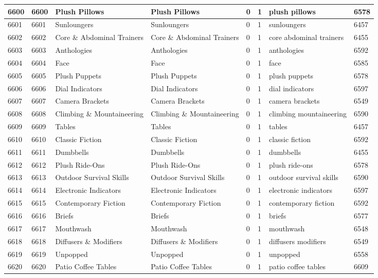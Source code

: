 \begin{longtable}{|l|l|l|l|l|l|l|l|}
6600 & 6600 & Plush Pillows & Plush Pillows & 0 & 1 & plush pillows & 6578 \\ \hline 
6601 & 6601 & Sunloungers & Sunloungers & 0 & 1 & sunloungers & 6457 \\ \hline 
6602 & 6602 & Core \& Abdominal Trainers & Core \& Abdominal Trainers & 0 & 1 & core abdominal trainers & 6455 \\ \hline 
6603 & 6603 & Anthologies & Anthologies & 0 & 1 & anthologies & 6592 \\ \hline 
6604 & 6604 & Face & Face & 0 & 1 & face & 6585 \\ \hline 
6605 & 6605 & Plush Puppets & Plush Puppets & 0 & 1 & plush puppets & 6578 \\ \hline 
6606 & 6606 & Dial Indicators & Dial Indicators & 0 & 1 & dial indicators & 6597 \\ \hline 
6607 & 6607 & Camera Brackets & Camera Brackets & 0 & 1 & camera brackets & 6549 \\ \hline 
6608 & 6608 & Climbing \& Mountaineering & Climbing \& Mountaineering & 0 & 1 & climbing mountaineering & 6590 \\ \hline 
6609 & 6609 & Tables & Tables & 0 & 1 & tables & 6457 \\ \hline 
6610 & 6610 & Classic Fiction & Classic Fiction & 0 & 1 & classic fiction & 6592 \\ \hline 
6611 & 6611 & Dumbbells & Dumbbells & 0 & 1 & dumbbells & 6455 \\ \hline 
6612 & 6612 & Plush Ride-Ons & Plush Ride-Ons & 0 & 1 & plush ride-ons & 6578 \\ \hline 
6613 & 6613 & Outdoor Survival Skills & Outdoor Survival Skills & 0 & 1 & outdoor survival skills & 6590 \\ \hline 
6614 & 6614 & Electronic Indicators & Electronic Indicators & 0 & 1 & electronic indicators & 6597 \\ \hline 
6615 & 6615 & Contemporary Fiction & Contemporary Fiction & 0 & 1 & contemporary fiction & 6592 \\ \hline 
6616 & 6616 & Briefs & Briefs & 0 & 1 & briefs & 6577 \\ \hline 
6617 & 6617 & Mouthwash & Mouthwash & 0 & 1 & mouthwash & 6548 \\ \hline 
6618 & 6618 & Diffusers \& Modifiers & Diffusers \& Modifiers & 0 & 1 & diffusers modifiers & 6549 \\ \hline 
6619 & 6619 & Unpopped & Unpopped & 0 & 1 & unpopped & 6558 \\ \hline 
6620 & 6620 & Patio Coffee Tables & Patio Coffee Tables & 0 & 1 & patio coffee tables & 6609 \\ \hline 

\end{longtable}
